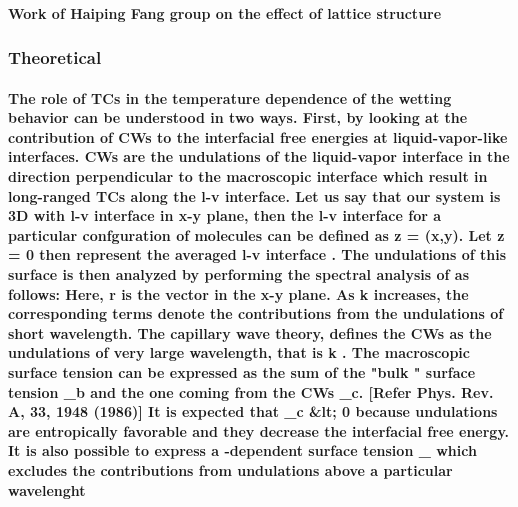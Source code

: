 \documentclass[a4paper,12pt,single,pdftex]{scrartcl}
\begin{document}
\label{ID_1854553780}\paragraph{Work of Haiping Fang group on the effect of lattice structure}

\label{ID_1942058277}\subsubsection{Theoretical}

\label{ID_896680657}\paragraph{The role of TCs in the temperature dependence of the wetting behavior can be understood in two ways. First, by looking at the contribution of CWs to the interfacial free energies at liquid-vapor-like interfaces. CWs are the undulations of the liquid-vapor interface in the direction perpendicular to the macroscopic interface which result in long-ranged TCs along the l-v interface. Let us say that our system is 3D with l-v interface in x-y plane, then the l-v interface for a particular confguration of molecules can be defined as z = \xi (x,y). Let z = 0 then represent the averaged l-v interface . The undulations of this surface is then analyzed by performing the spectral analysis of \xi as follows: Here, r is the vector  in the x-y plane. As k increases, the corresponding terms denote the contributions from the undulations of short wavelength. The capillary wave theory, defines the CWs as the undulations of very large wavelength, that is k . The macroscopic surface tension  \sigma can be expressed as the sum of the "bulk " surface tension  \sigma_b and the one coming from the CWs \sigma_c. [Refer Phys. Rev. A, 33, 1948 (1986)] It is expected that \sigma_c &lt; 0 because undulations are entropically favorable and they decrease the interfacial free energy.  It is also possible to express a \lambda-dependent surface tension \sigma_{\lambda} which excludes the contributions from undulations above a particular wavelenght \lambda}
\end{document}
